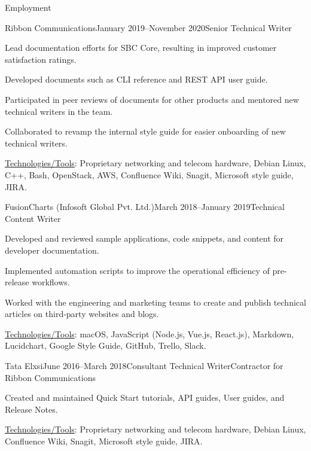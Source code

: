 \documentclass{resume} %
\begin{document}
\begin{rSection}{Employment}
\begin{rSubsection}{Ribbon Communications}{January 2019–November 2020}{Senior Technical Writer}{}
\item Lead documentation efforts for SBC Core, resulting in improved customer satisfaction ratings.
\item Developed documents such as CLI reference and REST API user guide.
\item Participated in peer reviews of documents for other products and mentored new technical writers in the team.
\item Collaborated to revamp the internal style guide for easier onboarding of new technical writers.
\item \underline{Technologies/Tools}: Proprietary networking and telecom hardware, Debian Linux, C++, Bash, OpenStack, AWS, Confluence Wiki, Snagit, Microsoft style guide, JIRA.
\end{rSubsection}



\begin{rSubsection}{FusionCharts (Infosoft Global Pvt. Ltd.)}{March 2018–January 2019}{Technical Content Writer}{}
\item Developed and reviewed sample applications, code snippets, and content for developer documentation.
\item Implemented automation scripts to improve the operational efficiency of pre-release workflows.
\item Worked with the engineering and marketing teams to create and publish technical articles on third-party websites and blogs.
\item \underline{Technologies/Tools}: macOS, JavaScript (Node.js, Vue.js, React.js), Markdown, Lucidchart, Google Style Guide, GitHub, Trello, Slack.
\end{rSubsection}


\begin{rSubsection}{Tata Elxsi}{June 2016–March 2018}{Consultant Technical Writer}{Contractor for Ribbon Communications}
\item Created and maintained Quick Start tutorials, API guides, User guides, and Release Notes.
\item \underline{Technologies/Tools}: Proprietary networking and telecom hardware, Debian Linux, Confluence Wiki, Snagit, Microsoft style guide, JIRA.
\end{rSubsection}


\end{rSection}
\end{document}
